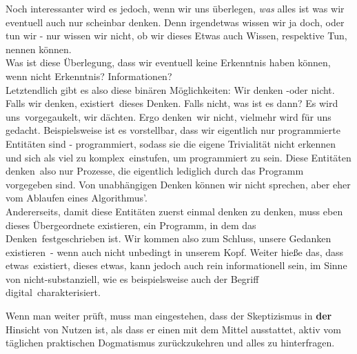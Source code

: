 \documentclass[12pt,a4paper]{article}
\begin{document}
Noch interessanter wird es jedoch, wenn wir uns überlegen, \emph{was} alles ist was wir eventuell auch nur scheinbar denken. Denn irgendetwas wissen wir ja doch, oder tun wir - nur wissen wir nicht, ob wir dieses Etwas auch \glqq Wissen\grqq , respektive \glqq Tun\grqq , nennen können.\\
Was ist diese \glqq Überlegung\grqq , dass wir eventuell keine Erkenntnis haben können, wenn nicht Erkenntnis? Informationen?\\
Letztendlich gibt es also diese binären Möglichkeiten: Wir denken -oder nicht.
Falls wir denken, \glqq existiert\grqq\ dieses Denken. Falls nicht, was ist es dann? Es wird \glqq uns\grqq\ vorgegaukelt, wir dächten. Ergo \glqq denken\grqq\  wir nicht, vielmehr \glqq wird für uns gedacht\grqq . 
Beispielsweise ist es vorstellbar, dass wir eigentlich nur programmierte Entitäten sind - programmiert, sodass sie die eigene Trivialität nicht erkennen und sich als \glqq viel zu komplex\grqq\ einstufen, um programmiert zu sein. Diese Entitäten \glqq denken\grqq\ also nur Prozesse, die eigentlich lediglich durch das Programm vorgegeben sind. Von unabhängigen Denken können wir nicht sprechen, aber eher vom Ablaufen eines Algorithmus'.\\ Andererseits, damit diese Entitäten zuerst einmal \glqq denken zu denken\grqq , muss eben dieses Übergeordnete existieren, ein Programm, in dem das \glqq Denken\grqq\ festgeschrieben ist. Wir kommen also zum Schluss, unsere Gedanken \glqq existieren\grqq\  - wenn auch nicht unbedingt in unserem Kopf. Weiter hieße das, dass \glqq etwas\grqq\ existiert, dieses \glqq etwas\grqq , kann jedoch auch rein informationell sein, im Sinne von nicht-substanziell, wie es beispielsweise auch der Begriff \glqq digital\grqq\ charakterisiert.

Wenn man weiter prüft, muss man eingestehen, dass der Skeptizismus in \textbf{der} Hinsicht von Nutzen ist, als dass er einen mit dem Mittel ausstattet, aktiv vom täglichen praktischen Dogmatismus zurückzukehren und alles zu hinterfragen.
\end{document}
